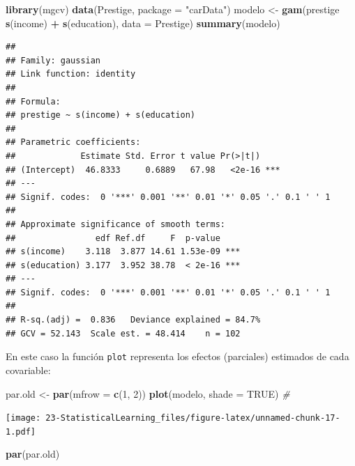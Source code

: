 \documentclass[]{book}
\newenvironment{Shaded}{\begin{snugshade}}{\end{snugshade}}
\newcommand{\CommentTok}[1]{\textcolor[rgb]{0.56,0.35,0.01}{\textit{#1}}}
\newcommand{\DataTypeTok}[1]{\textcolor[rgb]{0.13,0.29,0.53}{#1}}
\newcommand{\DecValTok}[1]{\textcolor[rgb]{0.00,0.00,0.81}{#1}}
\newcommand{\KeywordTok}[1]{\textcolor[rgb]{0.13,0.29,0.53}{\textbf{#1}}}
\newcommand{\NormalTok}[1]{#1}
\newcommand{\OperatorTok}[1]{\textcolor[rgb]{0.81,0.36,0.00}{\textbf{#1}}}
\newcommand{\OtherTok}[1]{\textcolor[rgb]{0.56,0.35,0.01}{#1}}
\newcommand{\StringTok}[1]{\textcolor[rgb]{0.31,0.60,0.02}{#1}}
\begin{document}
\begin{Shaded}
\begin{Highlighting}[]
\KeywordTok{library}\NormalTok{(mgcv)}
\KeywordTok{data}\NormalTok{(Prestige, }\DataTypeTok{package =} \StringTok{"carData"}\NormalTok{)}
\NormalTok{modelo <-}\StringTok{ }\KeywordTok{gam}\NormalTok{(prestige }\OperatorTok{~}\StringTok{ }\KeywordTok{s}\NormalTok{(income) }\OperatorTok{+}\StringTok{ }\KeywordTok{s}\NormalTok{(education), }\DataTypeTok{data =}\NormalTok{ Prestige)}
\KeywordTok{summary}\NormalTok{(modelo)}
\end{Highlighting}
\end{Shaded}

\begin{verbatim}
## 
## Family: gaussian 
## Link function: identity 
## 
## Formula:
## prestige ~ s(income) + s(education)
## 
## Parametric coefficients:
##             Estimate Std. Error t value Pr(>|t|)    
## (Intercept)  46.8333     0.6889   67.98   <2e-16 ***
## ---
## Signif. codes:  0 '***' 0.001 '**' 0.01 '*' 0.05 '.' 0.1 ' ' 1
## 
## Approximate significance of smooth terms:
##                edf Ref.df     F  p-value    
## s(income)    3.118  3.877 14.61 1.53e-09 ***
## s(education) 3.177  3.952 38.78  < 2e-16 ***
## ---
## Signif. codes:  0 '***' 0.001 '**' 0.01 '*' 0.05 '.' 0.1 ' ' 1
## 
## R-sq.(adj) =  0.836   Deviance explained = 84.7%
## GCV = 52.143  Scale est. = 48.414    n = 102
\end{verbatim}

En este caso la función \texttt{plot} representa los efectos (parciales) estimados de
cada covariable:

\begin{Shaded}
\begin{Highlighting}[]
\NormalTok{par.old <-}\StringTok{ }\KeywordTok{par}\NormalTok{(}\DataTypeTok{mfrow =} \KeywordTok{c}\NormalTok{(}\DecValTok{1}\NormalTok{, }\DecValTok{2}\NormalTok{))}
\KeywordTok{plot}\NormalTok{(modelo, }\DataTypeTok{shade =} \OtherTok{TRUE}\NormalTok{) }\CommentTok{# }
\end{Highlighting}
\end{Shaded}

\texttt{[image: 23-StatisticalLearning\_files/figure-latex/unnamed-chunk-17-1.pdf]}

\begin{Shaded}
\begin{Highlighting}[]
\KeywordTok{par}\NormalTok{(par.old)}
\end{Highlighting}
\end{Shaded}
\end{document}
